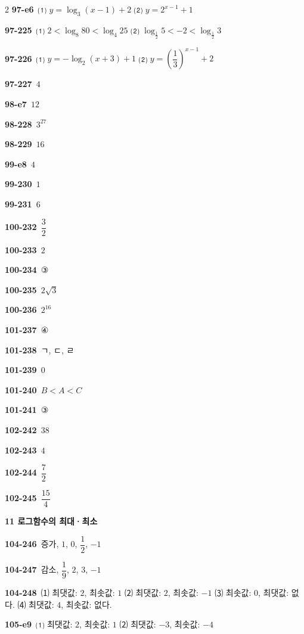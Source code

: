 \documentclass[10pt,a4paper]{article}
\begin{document}
\begin{multicols}{2}
\noindent\textbf{97-e6}\ ⑴ $y=\log_3 (x-1)+2$ \quad ⑵ $y=2^{x-1}+1$\par
\noindent\textbf{97-225}\ ⑴ $2<\log_8 80<\log_4 25$ \quad ⑵ $\log_{\frac{1}{2}} 5<-2<\log_{\frac{1}{2}} 3$\par
\noindent\textbf{97-226}\ ⑴ $y=-\log_2 (x+3)+1$ \quad ⑵ $y=\left(\dfrac{1}{3}\right)^{x-1}+2$\par
\noindent\textbf{97-227}\ $4$\par
\noindent\textbf{98-e7}\ $12$\par
\noindent\textbf{98-228}\ $3^{27}$\par
\noindent\textbf{98-229}\ $16$\par
\noindent\textbf{99-e8}\ $4$\par
\noindent\textbf{99-230}\ $1$\par
\noindent\textbf{99-231}\ $6$\par
\noindent\textbf{100-232}\ $\dfrac{3}{2}$\par
\noindent\textbf{100-233}\ $2$\par
\noindent\textbf{100-234}\ ③\par
\noindent\textbf{100-235}\ $2\sqrt{3}$\par
\noindent\textbf{100-236}\ $2^{16}$\par
\noindent\textbf{101-237}\ ④\par
\noindent\textbf{101-238}\ ㄱ, ㄷ, ㄹ\par
\noindent\textbf{101-239}\ $0$\par
\noindent\textbf{101-240}\ $B<A<C$\par
\noindent\textbf{101-241}\ ③\par
\noindent\textbf{102-242}\ $38$\par
\noindent\textbf{102-243}\ $4$\par
\noindent\textbf{102-244}\ $\dfrac{7}{2}$\par
\noindent\textbf{102-245}\ $\dfrac{15}{4}$\par
\noindent\textbf{11 로그함수의 최대·최소}\par\smallskip
\noindent\textbf{104-246}\ 증가, $1$, $0$, $\dfrac{1}{2}$, $-1$\par
\noindent\textbf{104-247}\ 감소, $\dfrac{1}{9}$, $2$, $3$, $-1$\par
\noindent\textbf{104-248}\ ⑴ 최댓값: $2$, 최솟값: $1$ ⑵ 최댓값: $2$, 최솟값: $-1$ ⑶ 최솟값: $0$, 최댓값: 없다. ⑷ 최댓값: $4$, 최솟값: 없다.\par
\noindent\textbf{105-e9}\ ⑴ 최댓값: $2$, 최솟값: $1$ ⑵ 최댓값: $-3$, 최솟값: $-4$\par

\end{multicols}
\end{document}
